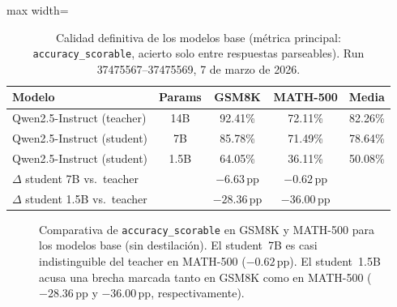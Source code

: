 \documentclass[11pt,a4paper]{article}
\begin{document}
\begin{table}[H]
\centering
\caption{Calidad definitiva de los modelos base (m\'etrica principal:
         \texttt{accuracy\_scorable}, acierto solo entre respuestas parseables).
         Run 37475567--37475569, 7 de marzo de 2026.}
\label{tab:quality-baselines}
\begin{adjustbox}{max width=\textwidth}
\begin{tabular}{lcccc}
\toprule
\textbf{Modelo} & \textbf{Params} & \textbf{GSM8K} & \textbf{MATH-500} & \textbf{Media} \\
\midrule
Qwen2.5-Instruct (teacher) & 14B  & 92.41\% & 72.11\% & 82.26\% \\
Qwen2.5-Instruct (student) & 7B   & 85.78\% & 71.49\% & 78.64\% \\
Qwen2.5-Instruct (student) & 1.5B & 64.05\% & 36.11\% & 50.08\% \\
\midrule
\multicolumn{2}{l}{\footnotesize $\Delta$ student 7B vs.\ teacher}
  & $-6.63$\,pp & $-0.62$\,pp & \\
\multicolumn{2}{l}{\footnotesize $\Delta$ student 1.5B vs.\ teacher}
  & $-28.36$\,pp & $-36.00$\,pp & \\
\bottomrule
\end{tabular}
\end{adjustbox}
\end{table}

\begin{figure}[H]
\centering
{}
\caption{Comparativa de \texttt{accuracy\_scorable} en GSM8K y MATH-500 para los modelos base
(sin destilaci\'on). El student~7B es casi indistinguible del teacher en
MATH-500 ($-0.62$\,pp). El student~1.5B acusa una brecha marcada tanto en
GSM8K como en MATH-500 ($-28.36$\,pp y $-36.00$\,pp, respectivamente).}
\label{fig:quality-baseline}
\end{figure}
\end{document}
